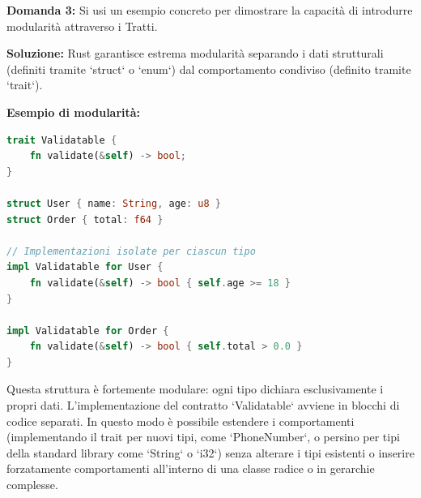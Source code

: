 \begin{exambox}
\textbf{Domanda 3:} Si usi un esempio concreto per dimostrare la capacità di introdurre modularità attraverso i Tratti.

\textbf{Soluzione:}
Rust garantisce estrema modularità separando i dati strutturali (definiti tramite `struct` o `enum`) dal comportamento condiviso (definito tramite `trait`).

\textbf{Esempio di modularità:}
\begin{lstlisting}[language=Rust]
trait Validatable {
    fn validate(&self) -> bool;
}

struct User { name: String, age: u8 }
struct Order { total: f64 }

// Implementazioni isolate per ciascun tipo
impl Validatable for User {
    fn validate(&self) -> bool { self.age >= 18 }
}

impl Validatable for Order {
    fn validate(&self) -> bool { self.total > 0.0 }
}
\end{lstlisting}
Questa struttura è fortemente modulare: ogni tipo dichiara esclusivamente i propri dati. L'implementazione del contratto `Validatable` avviene in blocchi di codice separati. In questo modo è possibile estendere i comportamenti (implementando il trait per nuovi tipi, come `PhoneNumber`, o persino per tipi della standard library come `String` o `i32`) senza alterare i tipi esistenti o inserire forzatamente comportamenti all'interno di una classe radice o in gerarchie complesse.
\end{exambox}

